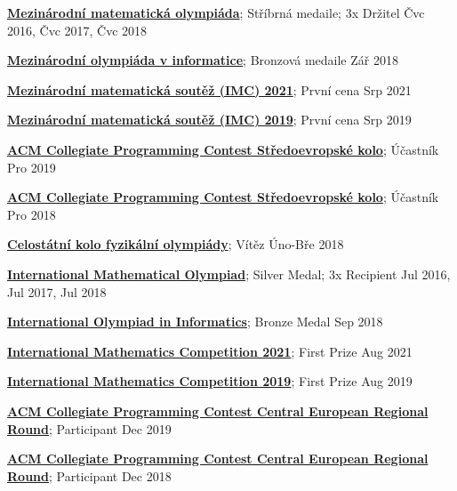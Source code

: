 \ifczech

\href{http://imo-official.org/participant_r.aspx?id=26455}{\textbf{Mezinárodní matematická olympiáda}}; \quad Stříbrná medaile; \quad 3x Držitel \hfill Čvc 2016, Čvc 2017, Čvc 2018 \par
\href{https://stats.ioinformatics.org/people/6494}{\textbf{Mezinárodní olympiáda v informatice}}; \quad Bronzová medaile \hfill Zář 2018\par
\href{https://www.imc-math.org.uk/?act=results&by=sum&year=2021}{\textbf{Mezinárodní matematická soutěž (IMC) 2021}}; \quad První cena \hfill Srp 2021\par
\href{https://www.imc-math.org.uk/?year=2019&section=results&item=bysum}{\textbf{Mezinárodní matematická soutěž (IMC) 2019}}; \quad První cena \hfill Srp 2019\par
\href{https://contest.felk.cvut.cz/19cerc/rank.html}{\textbf{ACM Collegiate Programming Contest Středoevropské kolo}}; \quad Účastník \hfill Pro 2019\par
\href{https://contest.felk.cvut.cz/18cerc/rank.html}{\textbf{ACM Collegiate Programming Contest Středoevropské kolo}}; \quad Účastník \hfill Pro 2018\par
\href{http://fyzikalniolympiada.cz/archiv/celostatni-kola/59}{\textbf{Celostátní kolo fyzikální olympiády}}; \quad Vítěz \hfill Úno-Bře 2018

\else

\href{http://imo-official.org/participant_r.aspx?id=26455}{\textbf{International Mathematical Olympiad}}; \quad Silver Medal; \quad 3x Recipient \hfill Jul 2016, Jul 2017, Jul 2018 \par
\href{https://stats.ioinformatics.org/people/6494}{\textbf{International Olympiad in Informatics}}; \quad Bronze Medal \hfill Sep 2018\par
\href{https://www.imc-math.org.uk/?act=results&by=sum&year=2021}{\textbf{International Mathematics Competition 2021}}; \quad First Prize \hfill Aug 2021\par
\href{https://www.imc-math.org.uk/?year=2019&section=results&item=bysum}{\textbf{International Mathematics Competition 2019}}; \quad First Prize \hfill Aug 2019\par
\href{https://contest.felk.cvut.cz/19cerc/rank.html}{\textbf{ACM Collegiate Programming Contest Central European Regional Round}}; \quad Participant \hfill Dec 2019\par
\href{https://contest.felk.cvut.cz/18cerc/rank.html}{\textbf{ACM Collegiate Programming Contest Central European Regional Round}}; \quad Participant \hfill Dec 2018\par

\fi